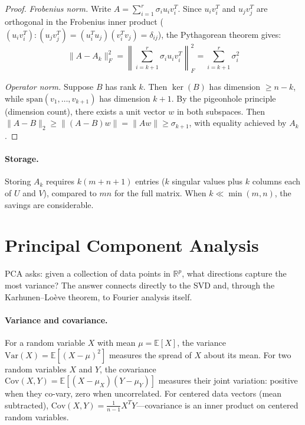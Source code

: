 \documentclass[12pt,a4paper]{report}
\theoremstyle{thms}
\theoremstyle{defns}
\begin{document}
\begin{proof}
    \textit{Frobenius norm.} Write $A = \sum_{i=1}^{r} \sigma_i u_i v_i^T$. Since $u_i v_i^T$ and $u_j v_j^T$ are orthogonal in the Frobenius inner product ($(u_iv_i^T) : (u_jv_j^T) = (u_i^Tu_j)(v_i^Tv_j) = \delta_{ij}$), the Pythagorean theorem gives:
    \begin{equation}
        \|A - A_k\|_F^2 = \left\|\sum_{i=k+1}^{r} \sigma_i u_i v_i^T\right\|_F^2 = \sum_{i=k+1}^{r} \sigma_i^2
    \end{equation}

    \textit{Operator norm.} Suppose $B$ has rank $k$. Then $\ker(B)$ has dimension $\geq n - k$, while $\mathrm{span}(v_1, \ldots, v_{k+1})$ has dimension $k + 1$. By the pigeonhole principle (dimension count), there exists a unit vector $w$ in both subspaces. Then $\|A - B\|_2 \geq \|(A - B)w\| = \|Aw\| \geq \sigma_{k+1}$, with equality achieved by $A_k$.
\end{proof}

\paragraph{Storage.} Storing $A_k$ requires $k(m + n + 1)$ entries ($k$ singular values plus $k$ columns each of $U$ and $V$), compared to $mn$ for the full matrix. When $k \ll \min(m, n)$, the savings are considerable.


\section{Principal Component Analysis}
\label{sec:pca}

PCA asks: given a collection of data points in $\mathbb{R}^p$, what directions capture the most variance? The answer connects directly to the SVD and, through the Karhunen--Lo\`{e}ve theorem, to Fourier analysis itself.

\paragraph{Variance and covariance.} For a random variable $X$ with mean $\mu = \mathbb{E}[X]$, the variance $\mathrm{Var}(X) = \mathbb{E}[(X - \mu)^2]$ measures the spread of $X$ about its mean. For two random variables $X$ and $Y$, the covariance $\mathrm{Cov}(X, Y) = \mathbb{E}[(X - \mu_X)(Y - \mu_Y)]$ measures their joint variation: positive when they co-vary, zero when uncorrelated. For centered data vectors (mean subtracted), $\mathrm{Cov}(X, Y) = \frac{1}{n-1}X^TY$—covariance is an inner product on centered random variables.
\end{document}
